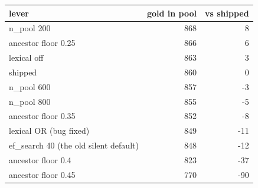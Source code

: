 \begin{tabular}{lrr}
\toprule
lever & gold in pool & vs shipped \\
\midrule
n\_pool 200 & 868 & 8 \\
ancestor floor 0.25 & 866 & 6 \\
lexical off & 863 & 3 \\
shipped & 860 & 0 \\
n\_pool 600 & 857 & -3 \\
n\_pool 800 & 855 & -5 \\
ancestor floor 0.35 & 852 & -8 \\
lexical OR (bug fixed) & 849 & -11 \\
ef\_search 40 (the old silent default) & 848 & -12 \\
ancestor floor 0.4 & 823 & -37 \\
ancestor floor 0.45 & 770 & -90 \\
\bottomrule
\end{tabular}
